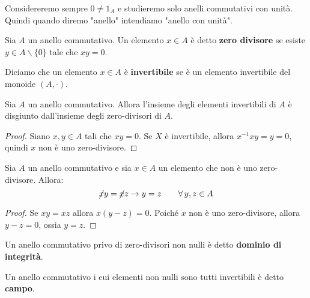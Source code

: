 \documentclass[../main.tex]{subfiles}
\begin{document}
Considereremo sempre $0 \neq 1_A$ e studieremo solo anelli commutativi con unità. Quindi quando diremo "anello" intendiamo "anello con unità".

\begin{definition}
    Sia $A$ un anello commutativo. Un elemento $x \in A$ è detto \textbf{zero divisore} se esiste $y \in A \backslash \{0\}$
    tale che $x y = 0$.
\end{definition}

\begin{definition}
    Diciamo che un elemento $x \in A$ è \textbf{invertibile} se è un elemento invertibile del monoide $(A, \cdot )$.
\end{definition}

\begin{proposition}
    Sia $A$ un anello commutativo. Allora l'insieme degli elementi invertibili di $A$ è disgiunto dall'insieme degli zero-divisori di $A$.
\end{proposition}

\begin{proof}
    Siano $x,y \in A$ tali che $x y = 0$. Se $X$ è invertibile, allora $x^{-1}xy = y = 0$, quindi $x$ non è uno zero-divisore.
\end{proof}

\begin{proposition}
    Sia $A$ un anello commutativo e sia $x \in A$ un elemento che non è uno zero-divisore. Allora:
    \begin{equation*}
        \cancel{x}y=\cancel{x}z \rightarrow y = z \qquad \forall y,z \in A
    \end{equation*}
\end{proposition}

\begin{proof}
    Se $xy = xz$ allora $x(y - z) = 0 $. Poiché $x$ non è uno zero-divisore, allora $y-z = 0$, ossia $y=z$.
\end{proof}

\begin{definition}
    Un anello commutativo privo di zero-divisori non nulli è detto \textbf{dominio di integrità}.
\end{definition}

\begin{definition}[Campo]
    Un anello commutativo i cui elementi non nulli sono tutti invertibili è detto \textbf{campo}.
\end{definition}
\end{document}
